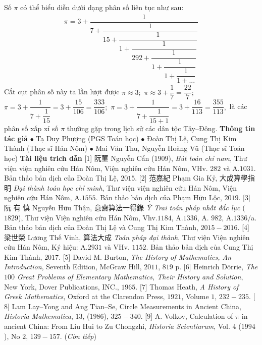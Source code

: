 \begin{multicols}{2}
	\vskip 0.1cm
	Số $\pi$  có thể biểu diễn dưới dạng phân số liên tục như sau: 
	\begin{align*}
		\pi  \!=\! 3 \!+\! \dfrac{1}{{7 \!+\! \dfrac{1}{{15 \!+\! \dfrac{1}{{1 \!+\! \dfrac{1}{{292 \!+\! \dfrac{1}{{1 \!+\! \dfrac{1}{{1 \!+\! \dfrac{1}{{1 \!+\! ...}}}}}}}}}}}}}}
	\end{align*}
	Cắt cụt phân số này ta lần lượt được  $\pi  \approx 3;$  $\pi  \approx 3 + \dfrac{1}{7} = \dfrac{{22}}{7};$ $\pi  = 3 + \dfrac{1}{{7 + \dfrac{1}{{15}}}} = 3 + \dfrac{{15}}{{106}} = \dfrac{{333}}{{106}};$ $\pi  = 3 + \dfrac{1}{{7 + \dfrac{1}{{15 + 1}}}} = 3 + \dfrac{{16}}{{113}} = \dfrac{{355}}{{113}},$
	là các phân số xấp xỉ số $\pi$ thường gặp trong lịch sử các dân tộc Tây--Đông.
	\vskip 0.1cm
	\textbf{\color{lichsutoanhoc}Thông tin tác giả}
	\vskip 0.1cm
	$\bullet$ Tạ Duy Phượng (PGS Toán học)
	\vskip 0.1cm
	$\bullet$ Đoàn Thị Lệ, Cung Thị Kim Thành (Thạc sĩ Hán Nôm)
	\vskip 0.1cm
	$\bullet$ Mai Văn Thu, Nguyễn Hoàng Vũ (Thạc sĩ Toán học)
	\vskip 0.1cm
	\textbf{\color{lichsutoanhoc}Tài liệu trich dẫn}
	\vskip 0.1cm
	[$1$]   阮菫 Nguyễn Cẩn ($1909$),  \textit{Bút toán chỉ nam}, Thư viện viện nghiên cứu Hán Nôm, Viện nghiên cứu Hán Nôm, VHv. $282$ và A.$1031$. Bản thảo bản dịch của Đoàn Thị Lệ, $2015$.
	\vskip 0.1cm
	[$2$] 范嘉紀  Phạm Gia Kỷ,  大成算學指明  \textit{Đại thành toán học chỉ minh}, Thư viện viện nghiên cứu Hán Nôm, Viện nghiên cứu Hán Nôm, A.$1555$. Bản thảo bản dịch của Phạm Hữu Lộc, $2019$.
	\vskip 0.1cm 
	[$3$]  阮 有 慎 Nguyễn Hữu Thận,  意齋算法一得錄  \textit{Ý Trai toán pháp nhất đắc lục} ($1829$), Thư viện Viện nghiên cứu Hán Nôm, Vhv.$1184$, A.$1336$, A. $982$, A.$1336$/a. Bản thảo bản dịch của Đoàn Thị Lệ và Cung Thị Kim Thành, $2015-2016$.
	\vskip 0.1cm 
	[$4$] 梁世榮  Lương Thế Vinh,  算法大成 \textit{Toán pháp đại thành}, Thư viện Viện nghiên cứu Hán Nôm, Ký hiệu: A.$2931$ và VHv. $1152$. Bản thảo bản dịch của Cung Thị Kim Thành, $2017$.
	\vskip 0.1cm
	[$5$] David M. Burton, \textit{The History of Mathematics, An Introduction}, Seventh Edition, McGraw Hill, $2011$, $819$ p.
	\vskip 0.1cm
	[$6$] Heinrich Dörrie, \textit{The $100$ Great Problems of Elementary Mathematics, Their History and Solution}, New York, Dover Publications, INC., $1965$.
	\vskip 0.1cm     
	[$7$] Thomas Heath, \textit{A History of Greek Mathematics}, Oxford at the Clarendon Press, $1921$, Volume $1$, $232-235$.
	\vskip 0.1cm
	[$8$] Lam Lay--Yong and Ang Tian--Se, Circle Measurements in Ancient China, \textit{Historia Mathematica}, $13$,  ($1986$), $325-340$.
	\vskip 0.1cm
	[$9$] A. Volkov, Calculation of $\pi$ in ancient China: From Liu Hui to Zu Chongzhi, \textit{Historia Scientiarum}, Vol. $4$ ($1994$), No $2$, $139-157$. 
	\vskip 0.1cm
	\hfill (\textit{Còn tiếp})
\end{multicols}